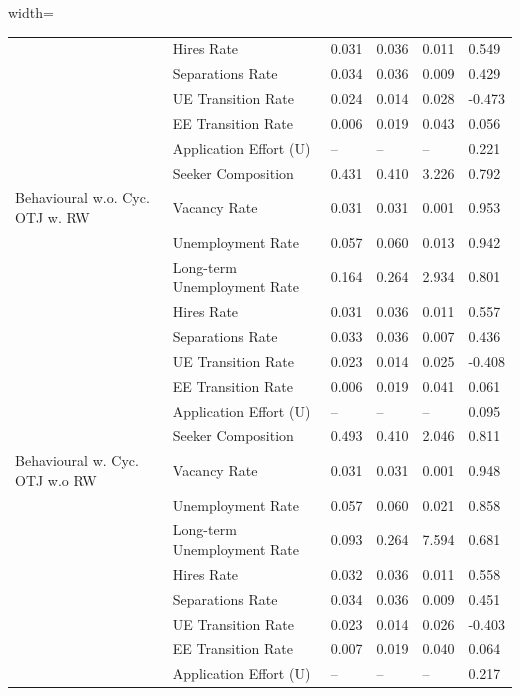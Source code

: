 \begin{table}[ht]
\begin{adjustbox}{width=\textwidth}
\begin{tabular}{llllll}
 & Hires Rate & 0.031 & 0.036 & 0.011 & 0.549 \\
 & Separations Rate & 0.034 & 0.036 & 0.009 & \cellcolor{yellow!25}0.429 \\
 & UE Transition Rate & 0.024 & 0.014 & 0.028 & -0.473 \\
 & EE Transition Rate & 0.006 & 0.019 & 0.043 & 0.056 \\
 & Application Effort (U) & -- & -- & -- & 0.221 \\
 & Seeker Composition & 0.431 & 0.410 & 3.226 & \cellcolor{yellow!25}0.792 \\
Behavioural w.o. Cyc. OTJ w. RW & Vacancy Rate & 0.031 & 0.031 & \cellcolor{yellow!25}0.001 & \cellcolor{yellow!25}0.953 \\
 & Unemployment Rate & 0.057 & 0.060 & 0.013 & \cellcolor{black!30}0.942 \\
 & Long-term Unemployment Rate & 0.164 & 0.264 & \cellcolor{yellow!25}2.934 & \cellcolor{yellow!25}0.801 \\
 & Hires Rate & 0.031 & 0.036 & 0.011 & \cellcolor{yellow!25}0.557 \\
 & Separations Rate & 0.033 & 0.036 & \cellcolor{yellow!25}0.007 & \cellcolor{yellow!25}0.436 \\
 & UE Transition Rate & 0.023 & 0.014 & 0.025 & -0.408 \\
 & EE Transition Rate & 0.006 & 0.019 & 0.041 & \cellcolor{yellow!25}0.061 \\
 & Application Effort (U) & -- & -- & -- & 0.095 \\
 & Seeker Composition & 0.493 & 0.410 & 2.046 & \cellcolor{yellow!25}0.811 \\
Behavioural w. Cyc. OTJ w.o RW & Vacancy Rate & 0.031 & 0.031 & \cellcolor{yellow!25}0.001 & \cellcolor{yellow!25}0.948 \\
 & Unemployment Rate & 0.057 & 0.060 & 0.021 & 0.858 \\
 & Long-term Unemployment Rate & 0.093 & 0.264 & 7.594 & 0.681 \\
 & Hires Rate & 0.032 & 0.036 & 0.011 & \cellcolor{yellow!25}0.558 \\
 & Separations Rate & 0.034 & 0.036 & 0.009 & \cellcolor{yellow!25}0.451 \\
 & UE Transition Rate & 0.023 & 0.014 & 0.026 & -0.403 \\
 & EE Transition Rate & 0.007 & 0.019 & 0.040 & \cellcolor{yellow!25}0.064 \\
 & Application Effort (U) & -- & -- & -- & 0.217 \\

\end{tabular}
\end{adjustbox}
\end{table}
